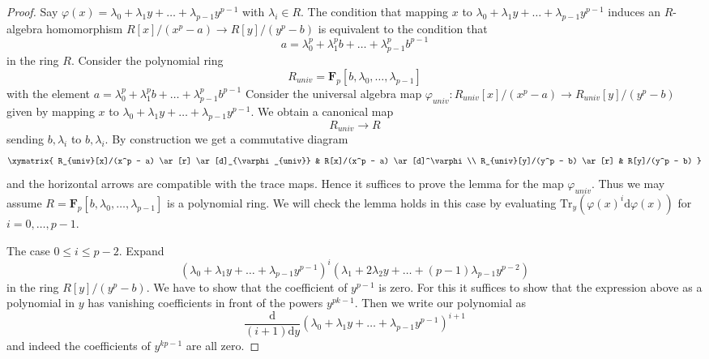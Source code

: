 \begin{proof}
Say $\varphi(x) = \lambda_0 + \lambda_1 y + \ldots + \lambda_{p - 1}y^{p - 1}$
with $\lambda_i \in R$. The condition that mapping $x$ to
$\lambda_0 + \lambda_1 y + \ldots + \lambda_{p - 1}y^{p - 1}$
induces an $R$-algebra homomorphism $R[x]/(x^p - a) \to R[y]/(y^p - b)$
is equivalent to the condition that
$$
a = \lambda_0^p + \lambda_1^p b + \ldots + \lambda_{p - 1}^pb^{p - 1}
$$
in the ring $R$. Consider the polynomial ring
$$
R_{univ} = \mathbf{F}_p[b, \lambda_0, \ldots, \lambda_{p - 1}]
$$
with the element
$a = \lambda_0^p + \lambda_1^p b + \ldots + \lambda_{p - 1}^pb^{p - 1}$
Consider the universal algebra map
$\varphi_{univ} : R_{univ}[x]/(x^p - a) \to R_{univ}[y]/(y^p - b)$
given by mapping $x$ to
$\lambda_0 + \lambda_1 y + \ldots + \lambda_{p - 1}y^{p - 1}$.
We obtain a canonical map
$$
R_{univ} \longrightarrow R
$$
sending $b, \lambda_i$ to $b, \lambda_i$. By construction we get a
commutative diagram
$$
\xymatrix{
R_{univ}[x]/(x^p - a) \ar[r] \ar[d]_{\varphi_{univ}} &
R[x]/(x^p - a) \ar[d]^\varphi \\
R_{univ}[y]/(y^p - b) \ar[r] & R[y]/(y^p - b)
}
$$
and the horizontal arrows are compatible with the trace maps. Hence it
suffices to prove the lemma for the map $\varphi_{univ}$. Thus we may
assume $R = \mathbf{F}_p[b, \lambda_0, \ldots, \lambda_{p - 1}]$
is a polynomial ring. We will check the lemma holds in this case
by evaluating
$\text{Tr}_y(\varphi(x)^i\text{d}\varphi(x))$ for $i = 0 , \ldots, p - 1$.

\medskip\noindent
The case $0 \leq i \leq p - 2$. Expand
$$
(\lambda_0 + \lambda_1 y + \ldots + \lambda_{p - 1}y^{p - 1})^i
(\lambda_1 + 2 \lambda_2 y + \ldots + (p - 1)\lambda_{p - 1}y^{p - 2})
$$
in the ring $R[y]/(y^p - b)$. We have to show that the coefficient
of $y^{p - 1}$ is zero. For this it suffices to show that
the expression above as a polynomial in $y$ has vanishing
coefficients in front of the powers $y^{pk - 1}$.
Then we write our polynomial as
$$
\frac{\text{d}}{(i + 1)\text{d}y}
(\lambda_0 + \lambda_1 y + \ldots + \lambda_{p - 1}y^{p - 1})^{i + 1}
$$
and indeed the coefficients of $y^{kp - 1}$ are all zero.


\end{proof}
